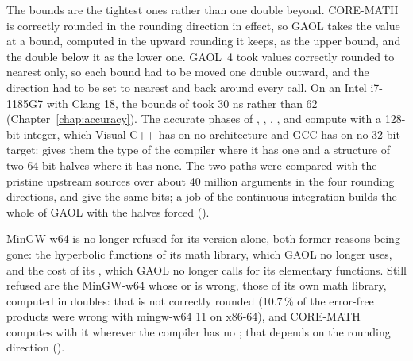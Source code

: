 \documentclass[12pt,a4paper,twoside,openright]{book}
\begin{document}
\medskip
The bounds are the tightest ones rather than one double beyond. CORE-MATH is
correctly rounded in the rounding direction in effect, so GAOL takes the
value at a bound, computed in the upward rounding it keeps, as the upper
bound, and the double below it as the lower one. GAOL~4 took values correctly
rounded to nearest only, so each bound had to be moved one double outward,
and the direction had to be set to nearest and back around every call. On an
Intel i7-1185G7 with Clang 18, the bounds of  took 30 ns rather
than 62 (Chapter~\ref{chap:accuracy}). The accurate phases of ,
, , ,  and  compute with
a 128-bit integer, which Visual C++ has on no architecture and GCC has on no
32-bit target:  gives them the type of the
compiler where it has one and a structure of two 64-bit halves where it has
none. The two paths were compared with the pristine upstream sources over
about 40 million arguments in the four rounding directions, and give the same
bits; a job of the continuous integration builds the whole of GAOL with the
halves forced ().

\medskip
MinGW-w64 is no longer refused for its version alone, both former reasons
being gone: the hyperbolic functions of its math library, which GAOL no
longer uses, and the cost of its , which GAOL no longer
calls for its elementary functions. Still refused are the MinGW-w64 whose
 or  is wrong, those of its own math library,
computed in doubles: that  is not correctly rounded (10.7\,\% of
the error-free products  were wrong with mingw-w64 11
on x86-64), and CORE-MATH computes with it wherever the compiler has no
; that  depends on the rounding direction
().
\end{document}

